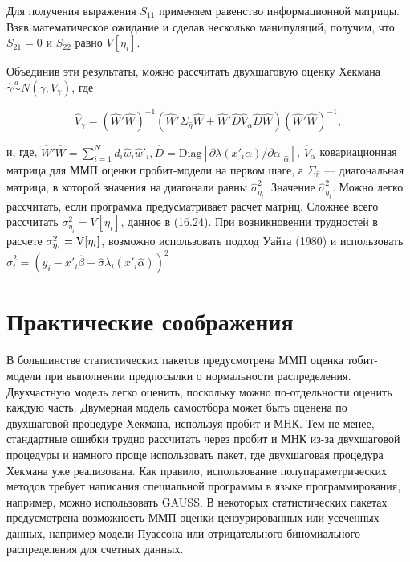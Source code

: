 Для получения выражения $S_{11}$ применяем равенство информационной матрицы. Взяв математическое ожидание и сделав несколько манипуляций, получим, что $S_{21}=0$ и $S_{22}$ равно $V[\eta_i]$.

Объединив эти результаты, можно рассчитать двухшаговую оценку Хекмана $\hat{\gamma} \overset{a}{\sim} N(\gamma,V_{\gamma})$, где

\begin{equation}
\hat{V}_{\gamma}=(\hat{W}'\hat{W})^{-1}(\hat{W}'\Sigma_{\hat{\eta}}\hat{W}+\hat{W}'\hat{D}\hat{V}_{\alpha}\hat{D}\hat{W})(\hat{W}'\hat{W})^{-1},
\end{equation}

и, где, $\hat{W}'\hat{W}=\sum^{N}_{i=1}d_{i}\hat{w}_{i}\hat{w}'_{i},\hat{D}=\mathrm{Diag}[\partial\lambda(x'_{i}\alpha)/\partial\alpha|_{\hat{\alpha}}]$, $\hat{V}_{\alpha}$ ковариационная матрица для ММП оценки пробит-модели на первом шаге, а $\Sigma_{\hat{\eta}}$ --- диагональная матрица, в которой значения на диагонали равны $\hat{\sigma}^{2}_{\eta_i}$. Значение $\hat{\sigma}^{2}_{\eta_i}$. Можно легко рассчитать, если программа предусматривает расчет матриц. Сложнее всего рассчитать $\sigma^{2}_{\eta_i}=V[\eta_i]$, данное в (16.24). При возникновении трудностей в расчете $\sigma^{2}_{\eta_i}=\mathrm{V}[\eta_i]$, возможно использовать подход Уайта (1980) и использовать $\hat{\sigma}^{2}_{i}=(y_{i}-x'_{i}\hat{\beta}+\hat{\sigma}\lambda_{i}(x'_{i}\hat{\alpha}))^2$

\section{Практические соображения}

В большинстве статистических пакетов предусмотрена ММП оценка тобит-модели при выполнении предпосылки о нормальности распределения. Двухчастную модель легко оценить, поскольку можно по-отдельности оценить каждую часть. Двумерная модель самоотбора может быть оценена по двухшаговой процедуре Хекмана, используя пробит и МНК. Тем не менее, стандартные ошибки трудно рассчитать через пробит и МНК из-за двухшаговой процедуры и намного проще использовать пакет, где двухшаговая процедура Хекмана уже реализована. Как правило, использование полупараметрических методов требует написания специальной программы в языке программирования, например, можно использовать GAUSS. В некоторых статистических пакетах предусмотрена возможность ММП оценки цензурированных или усеченных данных, например модели Пуассона или отрицательного биномиального распределения для счетных данных.

